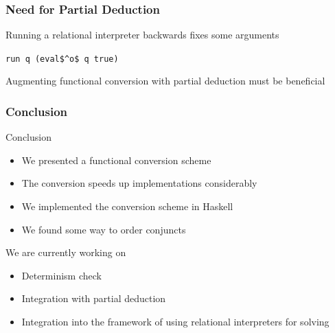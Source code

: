 \documentclass[xcolor=table, aspectratio=169]{beamer}
\newcommand{\backupbegin}{
   \newcounter{finalframe}
   \setcounter{finalframe}{\value{framenumber}}
}
\begin{document}
\begin{frame}[fragile]
  \frametitle{Need for Partial Deduction}

\begin{center}
Running a relational interpreter backwards fixes some arguments
\end{center}

\begin{center}
\begin{minipage}{0.3\textwidth}
  \lstinline{run q (eval$^o$ q true)}
\end{minipage}

\vfill

\begin{center}
  Augmenting functional conversion with partial deduction must be beneficial
\end{center}
\end{center}


\end{frame}


\begin{frame}[fragile]
  \frametitle{Conclusion}
Conclusion
  \begin{itemize}
    \item We presented a functional conversion scheme
    \item The conversion speeds up implementations considerably
    \item We implemented the conversion scheme in Haskell
    \item We found some way to order conjuncts
  \end{itemize}

\vfill

We are currently working on
  \begin{itemize}
    \item Determinism check
    \item Integration with partial deduction
    \item Integration into the framework of using relational interpreters for solving
  \end{itemize}
\end{frame}

\appendix
\backupbegin
\end{document}
